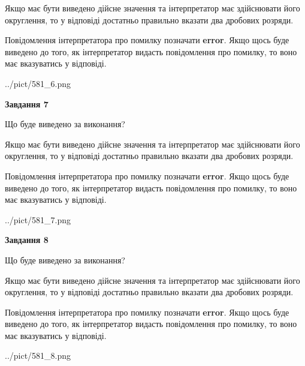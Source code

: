 \documentclass[12pt, ukrainian]{article}
\begin{document}
{\begin {Large}
Якщо має бути виведено дійсне значення та інтерпретатор має здійснювати його округлення, 
то у відповіді достатньо правильно вказати два дробових розряди.

Повідомлення інтерпретатора про помилку позначати \textbf{error}.
Якщо щось буде виведено до того, як інтерпретатор видасть повідомлення про помилку, 
то воно має вказуватись у відповіді. \par

\begin{center}
	{../pict/581_6.png}
\end{center}
\newpage

{\begin {center}\textbf{Завдання 7}\end {center}}\par
Що буде виведено за виконання? \par

Якщо має бути виведено дійсне значення та інтерпретатор має здійснювати його округлення, 
то у відповіді достатньо правильно вказати два дробових розряди.

Повідомлення інтерпретатора про помилку позначати \textbf{error}.
Якщо щось буде виведено до того, як інтерпретатор видасть повідомлення про помилку, 
то воно має вказуватись у відповіді. \par

\begin{center}
	{../pict/581_7.png}
\end{center}
\newpage

{\begin {center}\textbf{Завдання 8}\end {center}}\par
Що буде виведено за виконання? \par

Якщо має бути виведено дійсне значення та інтерпретатор має здійснювати його округлення, 
то у відповіді достатньо правильно вказати два дробових розряди.

Повідомлення інтерпретатора про помилку позначати \textbf{error}.
Якщо щось буде виведено до того, як інтерпретатор видасть повідомлення про помилку, 
то воно має вказуватись у відповіді. \par

\begin{center}
	{../pict/581_8.png}
\end{center}
\newpage


\end{Large}}
\end{document}
